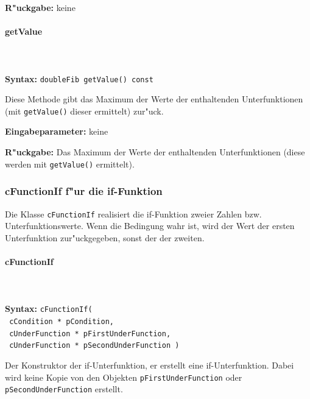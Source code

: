 \bigskip\noindent
\textbf{R"uckgabe:} keine


\paragraph{getValue}

\ \\\\\noindent
\textbf{Syntax:} \verb|doubleFib getValue() const|

\bigskip\noindent
Diese Methode gibt das Maximum der Werte der enthaltenden Unterfunktionen (mit \verb|getValue()| dieser ermittelt) zur"uck.

\bigskip\noindent
\textbf{Eingabeparameter:} keine

\bigskip\noindent
\textbf{R"uckgabe:} Das Maximum der Werte der enthaltenden Unterfunktionen (diese werden mit \verb|getValue()| ermittelt).




\subsubsection{cFunctionIf f"ur die if-Funktion}

Die Klasse \verb|cFunctionIf| realisiert die if-Funktion zweier Zahlen bzw. Unterfunktionswerte. Wenn die Bedingung wahr ist, wird der Wert der ersten Unterfunktion zur"uckgegeben, sonst der der zweiten.

\paragraph{cFunctionIf}

\ \\\\\noindent
\textbf{Syntax:} \verb|cFunctionIf(| \\\verb| cCondition * pCondition,| \\\verb| cUnderFunction * pFirstUnderFunction,| \\\verb| cUnderFunction * pSecondUnderFunction )|

\bigskip\noindent
Der Konstruktor der if-Unterfunktion, er erstellt eine if-Unterfunktion.
Dabei wird keine Kopie von den Objekten \verb|pFirstUnderFunction| oder \verb|pSecondUnderFunction| erstellt.

